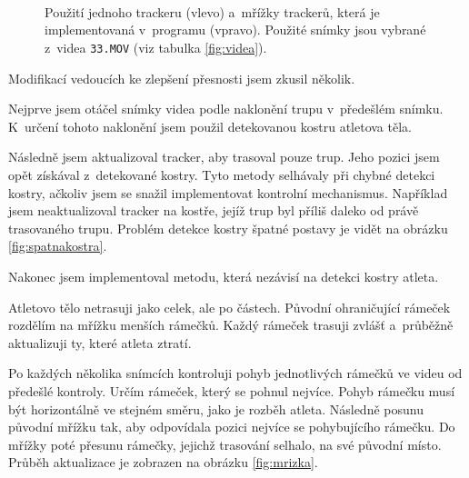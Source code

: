 \begin{figure}[p]\centering
     \\
     \\
     \\
    \caption{
        \centering\small
        Použití jednoho trackeru (vlevo) a~mřížky trackerů, která je implementovaná v~programu (vpravo). Použité snímky jsou vybrané z~videa \texttt{33.MOV} (viz tabulka \ref{fig:videa}).
    }
    \label{fig:ztrata}
\end{figure}

Modifikací vedoucích ke zlepšení přesnosti jsem zkusil několik.

Nejprve jsem otáčel snímky videa podle naklonění trupu v~předešlém snímku. K~určení tohoto naklonění jsem použil detekovanou kostru atletova těla.

Následně jsem aktualizoval tracker, aby trasoval pouze trup. Jeho pozici jsem opět získával z~detekované kostry. Tyto metody selhávaly při chybné detekci kostry, ačkoliv jsem se snažil implementovat kontrolní mechanismus. Například jsem neaktualizoval tracker na kostře, jejíž trup byl příliš daleko od právě trasovaného trupu. Problém detekce kostry špatné postavy je vidět na obrázku \ref{fig:spatnakostra}.

Nakonec jsem implementoval metodu, která nezávisí na detekci kostry atleta.

Atletovo tělo netrasuji jako celek, ale po částech. Původní ohraničující rámeček rozdělím na mřížku menších rámečků. Každý rámeček trasuji zvlášť a~průběžně aktualizuji ty, které atleta ztratí.

Po každých několika snímcích kontroluji pohyb jednotlivých rámečků ve videu od předešlé kontroly. Určím rámeček, který se pohnul nejvíce. Pohyb rámečku musí být horizontálně ve stejném směru, jako je rozběh atleta. Následně posunu původní mřížku tak, aby odpovídala pozici nejvíce se pohybujícího rámečku. Do mřížky poté přesunu rámečky, jejichž trasování selhalo, na své původní místo. Průběh aktualizace je zobrazen na obrázku \ref{fig:mrizka}.

